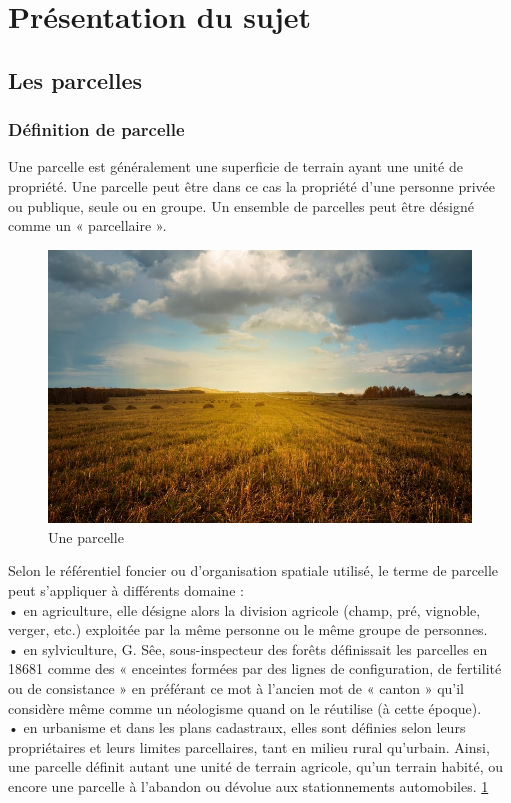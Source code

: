 \documentclass[12pt, openany]{report}
\begin{document}
\newpage
\strut 

\listoffigures
\tableofcontents
\chapter{Présentation du sujet}

\section{Les parcelles}

\subsection{Définition de parcelle}
Une parcelle est généralement une superficie de terrain ayant une unité de propriété. Une parcelle peut être dans ce cas la propriété d'une personne privée ou publique, seule ou en groupe.
Un ensemble de parcelles peut être désigné comme un « parcellaire ». 
\begin{figure}[hp]
\centering
\includegraphics[scale=0.5]{parcelle2.jpg}
\caption{Une parcelle}
\end{figure}
Selon le référentiel foncier ou d'organisation spatiale utilisé, le terme de parcelle peut s'appliquer à différents domaine :\\
•	en agriculture, elle désigne alors la division agricole (champ, pré, vignoble, verger, etc.) exploitée par la même personne ou le même groupe de personnes.\\
•	en sylviculture, G. Sêe, sous-inspecteur des forêts définissait les parcelles en 18681 comme des « enceintes formées par des lignes de configuration, de fertilité ou de consistance » en préférant ce mot à l'ancien mot de « canton » qu'il considère même comme un néologisme quand on le réutilise (à cette époque).\\
•	en urbanisme et dans les plans cadastraux, elles sont définies selon leurs propriétaires et leurs limites parcellaires, tant en milieu rural qu'urbain. Ainsi, une parcelle définit autant une unité de terrain agricole, qu'un terrain habité, ou encore une parcelle à l'abandon ou dévolue aux stationnements automobiles.  \hyperref[sec:refs]{1}
\end{document}
